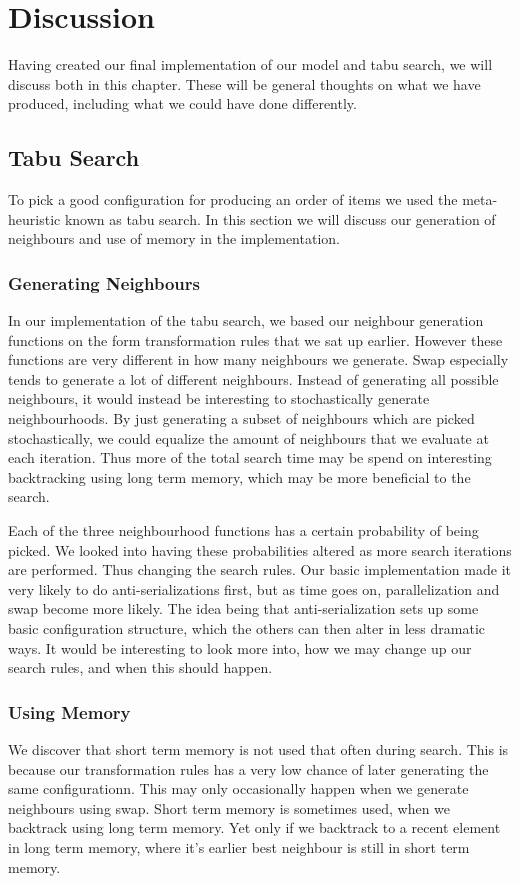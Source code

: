 \chapter{Discussion}\label{ch:discussion}
Having created our final implementation of our model and tabu search, we will discuss both in this chapter. These will be general thoughts on what we have produced, including what we could have done differently.



\section{Tabu Search}
To pick a good configuration for producing an order of items we used the meta-heuristic known as tabu search. In this section we will discuss our generation of neighbours and use of memory in the implementation.

\subsection{Generating Neighbours}
In our implementation of the tabu search, we based our neighbour generation functions on the form transformation rules that we sat up earlier. However these functions are very different in how many neighbours we generate. Swap especially tends to generate a lot of different neighbours. Instead of generating all possible neighbours, it would instead be interesting to stochastically generate neighbourhoods. By just generating a subset of neighbours which are picked stochastically, we could equalize the  amount of neighbours that we evaluate at each iteration. Thus more of the total search time may be spend on interesting backtracking using long term memory, which may be more beneficial to the search.

Each of the three neighbourhood functions has a certain probability of being picked. We looked into having these probabilities altered as more search iterations are performed. Thus changing the search rules. Our basic implementation made it very likely to do anti-serializations first, but as time goes on, parallelization and swap become more likely. The idea being that anti-serialization sets up some basic configuration structure, which the others can then alter in less dramatic ways. It would be interesting to look more into, how we may change up our search rules, and when this should happen.

\subsection{Using Memory}
We discover that short term memory is not used that often during search. This is because our transformation rules has a very low chance of later generating the same configurationn. This may only occasionally happen when we generate neighbours using swap. Short term memory is sometimes used, when we backtrack using long term memory. Yet only if we backtrack to a recent element in long term memory, where it's earlier best neighbour is still in short term memory.

